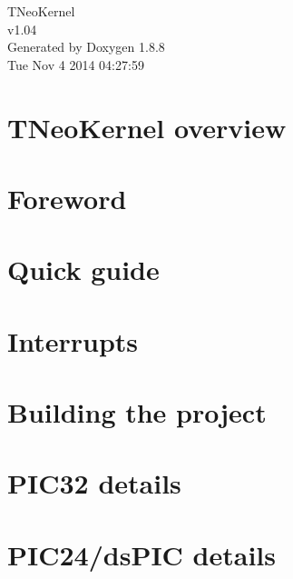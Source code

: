 \documentclass[twoside]{book}
\newcommand{\+}{\discretionary{\mbox{\scriptsize$\hookleftarrow$}}{}{}}
\newcommand{\clearemptydoublepage}{%
  \newpage{\pagestyle{empty}\cleardoublepage}%
}
\begin{document}
\hypersetup{pageanchor=false,
             bookmarks=true,
             bookmarksnumbered=true,
             pdfencoding=unicode
            }
\begin{titlepage}
\vspace*{7cm}
\begin{center}%
{\Large T\+Neo\+Kernel \\[1ex]\large v1.\+04 }\\
\vspace*{1cm}
{\large Generated by Doxygen 1.8.8}\\
\vspace*{0.5cm}
{\small Tue Nov 4 2014 04:27:59}\\
\end{center}
\end{titlepage}
\clearemptydoublepage
\tableofcontents
\clearemptydoublepage
{}
\hypersetup{pageanchor=true}

\chapter{T\+Neo\+Kernel overview}
\label{index}\hypertarget{index}{}
\chapter{Foreword}
\label{foreword}
\hypertarget{foreword}{}

\chapter{Quick guide}
\label{quick_guide}
\hypertarget{quick_guide}{}

\chapter{Interrupts}
\label{interrupts}
\hypertarget{interrupts}{}

\chapter{Building the project}
\label{building}
\hypertarget{building}{}

\chapter{P\+I\+C32 details}
\label{pic32_details}
\hypertarget{pic32_details}{}

\chapter{P\+I\+C24/ds\+P\+I\+C details}
\label{pic24_details}
\hypertarget{pic24_details}{}

\end{document}
